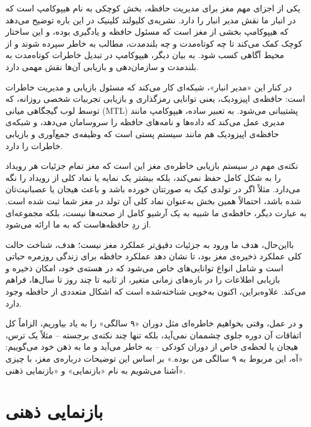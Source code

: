 یکی از اجزای مهم مغز برای مدیریت حافظه، بخش کوچکی به نام هیپوکامپ است که در انبار ما نقش مدیر انبار را دارد. نشریه‌ی کلیولند کلینیک در این باره توضیح می‌دهد که هیپوکامپ بخشی از مغز است که مسئول حافظه و یادگیری بوده، و این ساختار کوچک کمک می‌کند تا چه کوتاه‌مدت و چه بلندمدت، مطالب به خاطر سپرده شوند و از محیط آگاهی کسب شود\autocite{clevelandclinic-hippocampus}. به بیان دیگر، هیپوکامپ در تبدیل خاطرات کوتاه‌مدت به بلندمدت و سازمان‌دهی و بازیابی آن‌ها نقش مهمی دارد.

در کنار این «مدیر انبار»، شبکه‌ای کار می‌کند که مسئول بازیابی و مدیریت خاطرات است: حافظه‌ی اپیزودیک، یعنی توانایی رمزگذاری و بازیابی تجربیات شخصی روزانه، که توسط لوب گیجگاهی میانی (MTL) پشتیبانی می‌شود\autocite{roy2018hippocampalindex}. به تعبیر ساده، هیپوکامپ مانند مدیری عمل می‌کند که داده‌ها و نامه‌های حافظه را سروسامان می‌دهد، و شبکه‌ی حافظه‌ی اپیزودیک هم مانند سیستم پستی است که وظیفه‌ی جمع‌آوری و بازیابی خاطرات را دارد.

نکته‌ی مهم در سیستم بازیابی خاطره‌ی مغز این است که مغز تمام جزئیات هر رویداد را به شکل کامل حفظ نمی‌کند، بلکه بیشتر یک نمایه یا نماد کلی از رویداد را نگه می‌دارد. مثلاً اگر در تولدی کیک به صورتتان خورده باشد و باعث هیجان یا عصبانیت‌تان شده باشد، احتمالاً همین بخش به‌عنوان نماد کلی آن تولد در مغز شما ثبت شده است. به عبارت دیگر، حافظه‌ی ما شبیه به یک آرشیو کامل از صحنه‌ها نیست، بلکه مجموعه‌ای از ردِ حافظه‌هاست که به ما ارائه می‌شود\autocite{mitnews2017circuit}.

بااین‌حال، هدف ما ورود به جزئیات دقیق‌تر عملکرد مغز نیست؛ هدف، شناخت حالت کلی عملکرد ذخیره‌ی مغز بود، تا نشان دهد عملکرد حافظه برای زندگی روزمره حیاتی است و شامل انواع توانایی‌های خاص می‌شود که در هسته‌ی خود، امکان ذخیره و بازیابی اطلاعات را در بازه‌های زمانی متغیر، از ثانیه تا چند روز تا سال‌ها، فراهم می‌کند. علاوه‌براین، اکنون به‌خوبی شناخته‌شده است که اشکال متعددی از حافظه وجود دارد\autocite{frankland2019retrieval}.

و در عمل، وقتی بخواهیم خاطره‌ای مثل دوران «۹ سالگی» را به یاد بیاوریم، الزاماً کل اتفاقات آن دوره جلوی چشممان نمی‌آید، بلکه تنها چند نکته‌ی برجسته -- مثلاً یک ترس، هیجان یا لحظه‌ی خاص از دوران کودکی -- به خاطر می‌آید و ما به ذهن خود می‌گوییم: «آه، این مربوط به ۹ سالگی من بوده.» بر اساس این توضیحات درباره‌ی مغز، با چیزی آشنا می‌شویم به نام «بازنمایی» و «بازنمایی ذهنی».

\section{بازنمایی ذهنی}
\label{sec:mental-representation}

